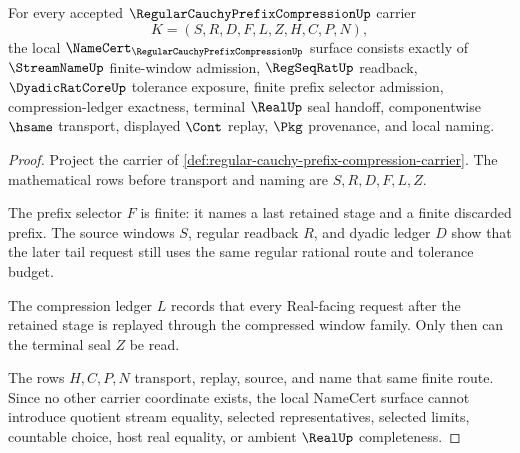 \begin{theorem}
\label{thm:regular-cauchy-prefix-compression-namecert-obligations}
For every accepted $\RegularCauchyPrefixCompressionUp$ carrier
$$
K=(S,R,D,F,L,Z,H,C,P,N),
$$
the local $\NameCert_{\RegularCauchyPrefixCompressionUp}$ surface consists exactly of $\StreamNameUp$ finite-window admission, $\RegSeqRatUp$ readback, $\DyadicRatCoreUp$ tolerance exposure, finite prefix selector admission, compression-ledger exactness, terminal $\RealUp$ seal handoff, componentwise $\hsame$ transport, displayed $\Cont$ replay, $\Pkg$ provenance, and local naming.
\end{theorem}
\begin{proof}
Project the carrier of \autoref{def:regular-cauchy-prefix-compression-carrier}. The mathematical rows before transport and naming are $S,R,D,F,L,Z$.

The prefix selector $F$ is finite: it names a last retained stage and a finite discarded prefix. The source windows $S$, regular readback $R$, and dyadic ledger $D$ show that the later tail request still uses the same regular rational route and tolerance budget.

The compression ledger $L$ records that every Real-facing request after the retained stage is replayed through the compressed window family. Only then can the terminal seal $Z$ be read.

The rows $H,C,P,N$ transport, replay, source, and name that same finite route. Since no other carrier coordinate exists, the local NameCert surface cannot introduce quotient stream equality, selected representatives, selected limits, countable choice, host real equality, or ambient $\RealUp$ completeness.
\end{proof}

